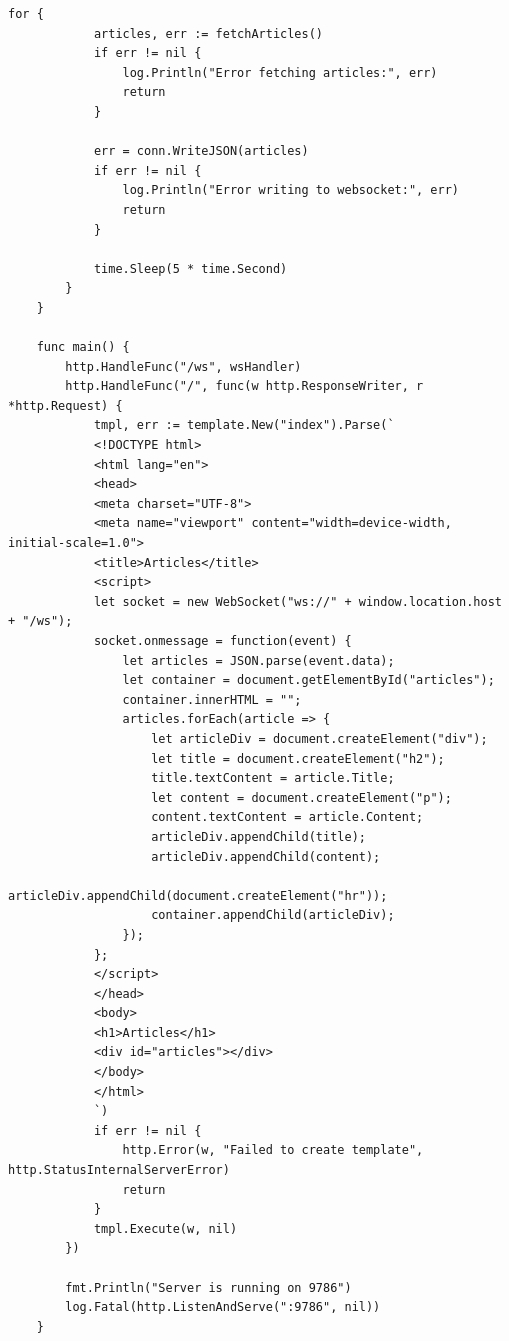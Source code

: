 \documentclass[a4paper, 14pt]{extarticle}
\begin{document}
\begin{lstlisting}[language={},caption={client.go},label={lst:code1}]
		for {
			articles, err := fetchArticles()
			if err != nil {
				log.Println("Error fetching articles:", err)
				return
			}
			
			err = conn.WriteJSON(articles)
			if err != nil {
				log.Println("Error writing to websocket:", err)
				return
			}
			
			time.Sleep(5 * time.Second)
		}
	}
	
	func main() {
		http.HandleFunc("/ws", wsHandler)
		http.HandleFunc("/", func(w http.ResponseWriter, r *http.Request) {
			tmpl, err := template.New("index").Parse(`
			<!DOCTYPE html>
			<html lang="en">
			<head>
			<meta charset="UTF-8">
			<meta name="viewport" content="width=device-width, initial-scale=1.0">
			<title>Articles</title>
			<script>
			let socket = new WebSocket("ws://" + window.location.host + "/ws");
			socket.onmessage = function(event) {
				let articles = JSON.parse(event.data);
				let container = document.getElementById("articles");
				container.innerHTML = "";
				articles.forEach(article => {
					let articleDiv = document.createElement("div");
					let title = document.createElement("h2");
					title.textContent = article.Title;
					let content = document.createElement("p");
					content.textContent = article.Content;
					articleDiv.appendChild(title);
					articleDiv.appendChild(content);
					articleDiv.appendChild(document.createElement("hr"));
					container.appendChild(articleDiv);
				});
			};
			</script>
			</head>
			<body>
			<h1>Articles</h1>
			<div id="articles"></div>
			</body>
			</html>
			`)
			if err != nil {
				http.Error(w, "Failed to create template", http.StatusInternalServerError)
				return
			}
			tmpl.Execute(w, nil)
		})
		
		fmt.Println("Server is running on 9786")
		log.Fatal(http.ListenAndServe(":9786", nil))
	}
	\end{lstlisting}
\end{document}
